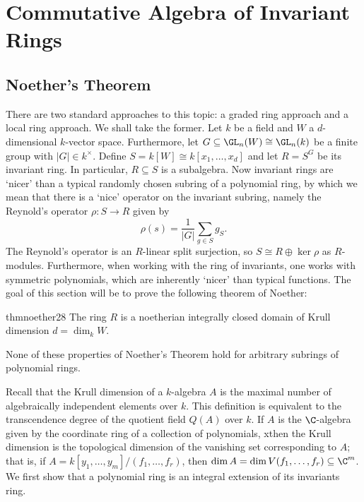 \newpage
\section{Commutative Algebra of Invariant Rings}
\subsection{Noether's Theorem}

There are two standard approaches to this topic: a graded ring approach and a local ring approach. We shall take the former. Let $k$ be a field and $W$ a $d$-dimensional $k$-vector space. Furthermore, let $G \subseteq \GL_n(W) \cong \GL_n(k)$ be a finite group with $|G| \in k^\times$. Define $S=k[W] \cong k[x_1,\ldots,x_d]$ and let $R= S^G$ be its invariant ring. In particular, $R \subseteq S$ is a subalgebra. Now invariant rings are `nicer' than a typical randomly chosen subring of a polynomial ring, by which we mean that there is a `nice' operator on the invariant subring, namely the Reynold's operator $\rho: S \to R$ given by
		\[
		\rho(s)= \dfrac{1}{|G|} \sum_{g \in S} g_S.
		\]
The Reynold's operator is an $R$-linear split surjection, so $S \cong R \oplus \ker \rho$ as $R$-modules. Furthermore, when working with the ring of invariants, one works with symmetric polynomials, which are inherently `nicer' than typical functions. The goal of this section will be to prove the following theorem of Noether:


\begin{restatable}[Noether, 1928]{thm}{noether28} \label{thm:noether28}
The ring $R$ is a noetherian integrally closed domain of Krull dimension $d= \dim_k W$. 
\end{restatable}


\begin{rem}
None of these properties of Noether's Theorem hold for arbitrary subrings of polynomial rings. 
\end{rem}


Recall that the Krull dimension of a $k$-algebra $A$ is the maximal number of algebraically independent elements over $k$. This definition is equivalent to the transcendence degree of the quotient field $Q(A)$ over $k$. If $A$ is the $\C$-algebra given by the coordinate ring of a collection of polynomials, xthen the Krull dimension is the topological dimension of the vanishing set corresponding to $A$; that is, if $A= k[y_1,\ldots,y_m]/(f_1,\ldots,f_r)$, then $\dim A= \dim V(f_1,\ldots,f_r) \subseteq \C^m$. We first show that a polynomial ring is an integral extension of its invariants ring.
 
